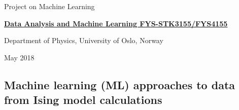 \documentclass[%
oneside,                 %
final,                   %
10pt]{article}
\begin{document}

\newcommand{\exercisesection}[1]{\subsection*{#1}}






\thispagestyle{empty}

\begin{center}
{\LARGE\bf
\begin{spacing}{1.25}
Project on Machine Learning
\end{spacing}
}
\end{center}


\begin{center}
{\bf \href{{http://www.uio.no/studier/emner/matnat/fys/FYS3155/index-eng.html}}{Data Analysis and Machine Learning FYS-STK3155/FYS4155}}
\end{center}

    \begin{center}
\centerline{{\small Department of Physics, University of Oslo, Norway}}
\end{center}
    

\begin{center}
May 2018
\end{center}

\vspace{1cm}


\subsection{Machine learning (ML) approaches to data from Ising model calculations}
\end{document}
